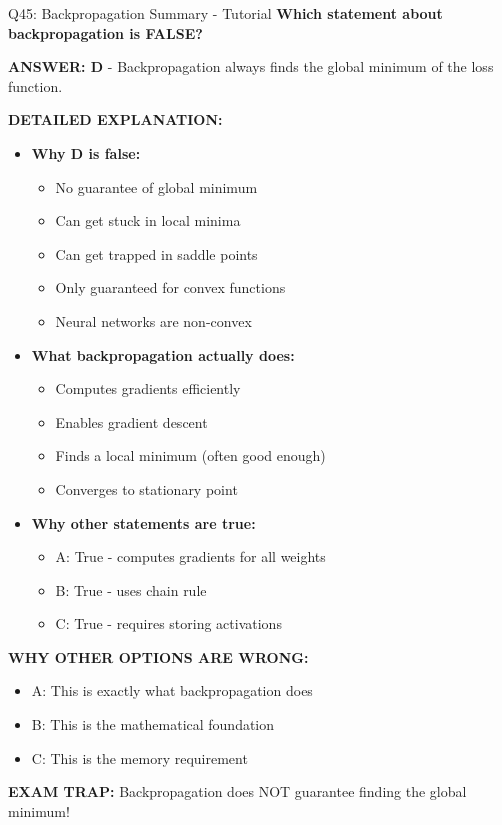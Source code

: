 \documentclass[8pt]{beamer}
\begin{document}
	\begin{frame}{Q45: Backpropagation Summary - Tutorial}
		\fontsize{6.5}{7.5}\selectfont
		\textbf{Which statement about backpropagation is FALSE?}
		
		\vspace{0.05cm}
		\textcolor{myblue}{\textbf{ANSWER: D}} - Backpropagation always finds the global minimum of the loss function.
		
		\vspace{0.05cm}
		\textbf{DETAILED EXPLANATION:}
		\begin{itemize}
			\item \textbf{Why D is false:}
			\begin{itemize}
				\item No guarantee of global minimum
				\item Can get stuck in local minima
				\item Can get trapped in saddle points
				\item Only guaranteed for convex functions
				\item Neural networks are non-convex
			\end{itemize}
			\item \textbf{What backpropagation actually does:}
			\begin{itemize}
				\item Computes gradients efficiently
				\item Enables gradient descent
				\item Finds a local minimum (often good enough)
				\item Converges to stationary point
			\end{itemize}
			\item \textbf{Why other statements are true:}
			\begin{itemize}
				\item \textcolor{mygreen}{A:} True - computes gradients for all weights
				\item \textcolor{mygreen}{B:} True - uses chain rule
				\item \textcolor{mygreen}{C:} True - requires storing activations
			\end{itemize}
		\end{itemize}
		
		\vspace{0.05cm}
		\textcolor{myred}{\textbf{WHY OTHER OPTIONS ARE WRONG:}}
		\begin{itemize}
			\item \textcolor{myred}{A:} This is exactly what backpropagation does
			\item \textcolor{myred}{B:} This is the mathematical foundation
			\item \textcolor{myred}{C:} This is the memory requirement
		\end{itemize}
		
		\textcolor{myred}{\textbf{EXAM TRAP:}} Backpropagation does \textcolor{myred}{NOT} guarantee finding the global minimum!
	\end{frame}
	
\end{document}
